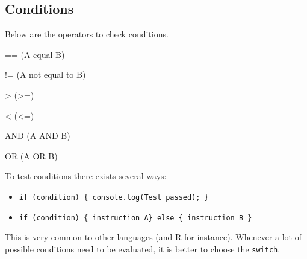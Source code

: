 \documentclass[]{book}
\newenvironment{Shaded}{\begin{snugshade}}{\end{snugshade}}
\newcommand{\AttributeTok}[1]{\textcolor[rgb]{0.77,0.63,0.00}{#1}}
\newcommand{\CommentTok}[1]{\textcolor[rgb]{0.56,0.35,0.01}{\textit{#1}}}
\newcommand{\DecValTok}[1]{\textcolor[rgb]{0.00,0.00,0.81}{#1}}
\newcommand{\KeywordTok}[1]{\textcolor[rgb]{0.13,0.29,0.53}{\textbf{#1}}}
\newcommand{\NormalTok}[1]{#1}
\newcommand{\OperatorTok}[1]{\textcolor[rgb]{0.81,0.36,0.00}{\textbf{#1}}}
\newcommand{\SpecialCharTok}[1]{\textcolor[rgb]{0.00,0.00,0.00}{#1}}
\newcommand{\VariableTok}[1]{\textcolor[rgb]{0.00,0.00,0.00}{#1}}
\newcommand{\VerbatimStringTok}[1]{\textcolor[rgb]{0.31,0.60,0.02}{#1}}
\providecommand{\tightlist}{%
  \setlength{\itemsep}{0pt}\setlength{\parskip}{0pt}}
\begin{document}
\begin{Shaded}
\end{Shaded}

\hypertarget{conditions}{%
\subsection{Conditions}\label{conditions}}

Below are the operators to check conditions.

== (A equal B)

!= (A not equal to B)

\textgreater{} (\textgreater{}=)

\textless{} (\textless{}=)

AND (A AND B)

OR (A OR B)

To test conditions there exists several ways:

\begin{itemize}
\tightlist
\item
  \texttt{if\ (condition)\ \{\ console.log(\textquotesingle{}Test\ passed\textquotesingle{});\ \}}
\item
  \texttt{if\ (condition)\ \{\ instruction\ A\}\ else\ \{\ instruction\ B\ \}}
\end{itemize}

This is very common to other languages (and R for instance). Whenever a lot of possible conditions need to be evaluated, it is better to choose the \texttt{switch}.
\end{document}
